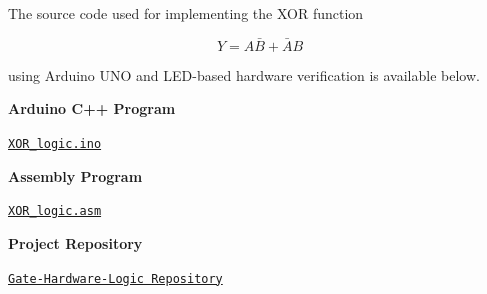 \documentclass[12pt,a4paper]{article}
\begin{document}
\begin{codebox}

\begin{center}

The source code used for implementing the XOR function

\[
Y=A\bar{B}+\bar{A}B
\]

using Arduino UNO and LED-based hardware verification is available below.

\vspace{0.4cm}

\textbf{Arduino C++ Program}

\begin{linkbox}
\centering
\href{https://github.com/Bharath16304/Gate-Hardware-Logic/blob/main/XOR_logic.ino}
{\texttt{XOR\_logic.ino}}
\end{linkbox}

\vspace{0.3cm}

\textbf{Assembly Program}

\begin{linkbox}
\centering
\href{https://github.com/Bharath16304/Gate-Hardware-Logic/blob/main/XOR_logic.asm}
{\texttt{XOR\_logic.asm}}
\end{linkbox}

\vspace{0.3cm}

\textbf{Project Repository}

\begin{linkbox}
\centering
\href{https://github.com/Bharath16304/Gate-Hardware-Logic}
{\texttt{Gate-Hardware-Logic Repository}}
\end{linkbox}

\end{center}

\end{codebox}
\end{document}
